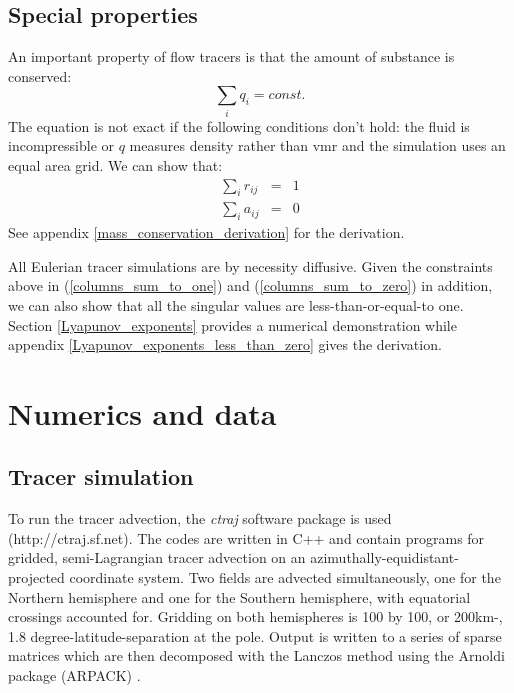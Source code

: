 \documentclass{article}
\begin{document}
\subsection{Special properties}

An important property of flow tracers is that the amount of substance is 
conserved:
\begin{equation}
\sum_i q_i = const.
\end{equation}
The equation is not exact if the following conditions don't hold:
the fluid is incompressible or $q$ measures
density rather than vmr and the simulation uses an equal area grid. 
We can show that:
\begin{eqnarray}
\sum_i r_{ij} & = & 1 
\label{columns_sum_to_one}\\
\sum_i a_{ij} & = & 0
\label{columns_sum_to_zero}
\end{eqnarray}
See appendix \ref{mass_conservation_derivation} for the derivation.

All Eulerian tracer simulations are by necessity diffusive. 
Given the constraints above in (\ref{columns_sum_to_one}) and
(\ref{columns_sum_to_zero}) in addition, 
we can also show that all the singular values are less-than-or-equal-to one.
Section \ref{Lyapunov_exponents} provides a numerical demonstration while 
appendix \ref{Lyapunov_exponents_less_than_zero} gives the derivation.

\section{Numerics and data}

\subsection{Tracer simulation}

To run the tracer advection, the \textit{ctraj} software package is used
(http://ctraj.sf.net).  The codes are written in C++ and contain programs
for gridded, semi-Lagrangian tracer advection on an 
azimuthally-equidistant-projected coordinate system.
Two fields are advected simultaneously, one for the Northern hemisphere
and one for the Southern hemisphere, with equatorial crossings accounted for.
Gridding on both hemispheres is 100 by 100, or 200km-,
1.8 degree-latitude-separation at the pole.  
Output is written to a series of sparse matrices which are then
decomposed with the Lanczos method \citep{Golub_Van_Loan1996} using the
Arnoldi package (ARPACK) \citep{Lehoucq_Scott1996}.
\end{document}
